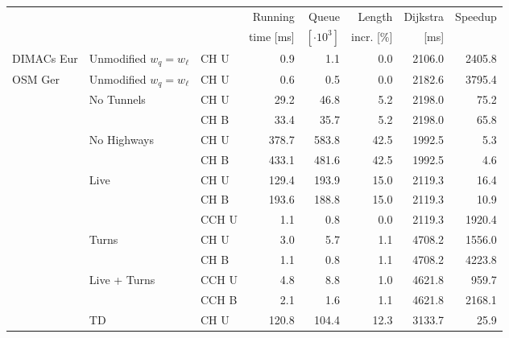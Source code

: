 \begin{tabular}{lllrrrrr}
\toprule
 & & &   Running &                Queue &     Length & Dijkstra & Speedup \\ & & & time [ms] & $[\cdot 10^3]$ & incr. [\%] &     [ms] &         \\
\midrule
DIMACs Eur & Unmodified $w_q = w_{\ell}$ & CH U &              0.9 &              1.1 &       0.0 &                    2106.0 &   2405.8 \\
\addlinespace
OSM Ger & Unmodified $w_q = w_{\ell}$ & CH U &              0.6 &              0.5 &       0.0 &                    2182.6 &   3795.4 \\
\addlinespace
        & No Tunnels & CH U &             29.2 &             46.8 &       5.2 &                    2198.0 &     75.2 \\
        &    & CH B &             33.4 &             35.7 &       5.2 &                    2198.0 &     65.8 \\
\addlinespace
        & No Highways & CH U &            378.7 &            583.8 &      42.5 &                    1992.5 &      5.3 \\
        &    & CH B &            433.1 &            481.6 &      42.5 &                    1992.5 &      4.6 \\
\addlinespace
        & Live & CH U &            129.4 &            193.9 &      15.0 &                    2119.3 &     16.4 \\
        &    & CH B &            193.6 &            188.8 &      15.0 &                    2119.3 &     10.9 \\
        &    & CCH U &              1.1 &              0.8 &       0.0 &                    2119.3 &   1920.4 \\
\addlinespace
        & Turns & CH U &              3.0 &              5.7 &       1.1 &                    4708.2 &   1556.0 \\
        &    & CH B &              1.1 &              0.8 &       1.1 &                    4708.2 &   4223.8 \\
\addlinespace
        & Live + Turns & CCH U &              4.8 &              8.8 &       1.0 &                    4621.8 &    959.7 \\
        &    & CCH B &              2.1 &              1.6 &       1.1 &                    4621.8 &   2168.1 \\
\addlinespace
        & TD & CH U &            120.8 &            104.4 &      12.3 &                    3133.7 &     25.9 \\

\end{tabular}

